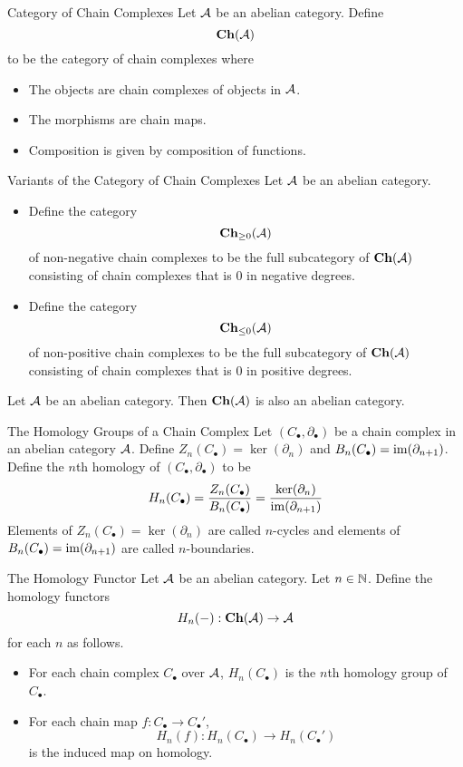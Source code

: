 \documentclass[a4paper]{article}
\begin{document}
\begin{defn}{Category of Chain Complexes}{} Let $\mathcal{A}$ be an abelian category. Define $$\bold{Ch}(\mathcal{A})$$ to be the category of chain complexes where 
\begin{itemize}
\item The objects are chain complexes of objects in $\mathcal{A}$. 
\item The morphisms are chain maps. 
\item Composition is given by composition of functions. 
\end{itemize}
\end{defn}

\begin{defn}{Variants of the Category of Chain Complexes}{} Let $\mathcal{A}$ be an abelian category. 
\begin{itemize}
\item Define the category $$\bold{Ch}_{\geq 0}(\mathcal{A})$$ of non-negative chain complexes to be the full subcategory of $\bold{Ch}(\mathcal{A})$ consisting of chain complexes that is $0$ in negative degrees. 
\item Define the category $$\bold{Ch}_{\leq 0}(\mathcal{A})$$ of non-positive chain complexes to be the full subcategory of $\bold{Ch}(\mathcal{A})$ consisting of chain complexes that is $0$ in positive degrees. 
\end{itemize}
\end{defn}

\begin{thm}{}{} Let $\mathcal{A}$ be an abelian category. Then $\bold{Ch}(\mathcal{A})$ is also an abelian category. 
\end{thm}

\begin{defn}{The Homology Groups of a Chain Complex}{} Let $(C_\bullet,\partial_\bullet)$ be a chain complex in an abelian category $\mathcal{A}$. Define $Z_n(C_\bullet)=\ker(\partial_n)$ and $B_n(C_\bullet)=\operatorname{im}(\partial_{n+1})$. Define the $n$th homology of $(C_\bullet,\partial_\bullet)$ to be $$H_n(C_\bullet)=\frac{Z_n(C_\bullet)}{B_n(C_\bullet)}=\frac{\ker(\partial_n)}{\operatorname{im}(\partial_{n+1})}$$
Elements of $Z_n(C_\bullet)=\ker(\partial_n)$ are called $n$-cycles and elements of $B_n(C_\bullet)=\operatorname{im}(\partial_{n+1})$ are called $n$-boundaries. 
\end{defn}

\begin{defn}{The Homology Functor}{} Let $\mathcal{A}$ be an abelian category. Let $n\in\mathbb{N}$. Define the homology functors $$H_n(-):\bold{Ch}(\mathcal{A})\to\mathcal{A}$$ for each $n$ as follows. 
\begin{itemize}
\item For each chain complex $C_\bullet$ over $\mathcal{A}$, $H_n(C_\bullet)$ is the $n$th homology group of $C_\bullet$. 
\item For each chain map $f:C_\bullet\to C_\bullet'$, $$H_n(f):H_n(C_\bullet)\to H_n(C_\bullet')$$ is the induced map on homology. 
\end{itemize}
\end{defn}
\end{document}
